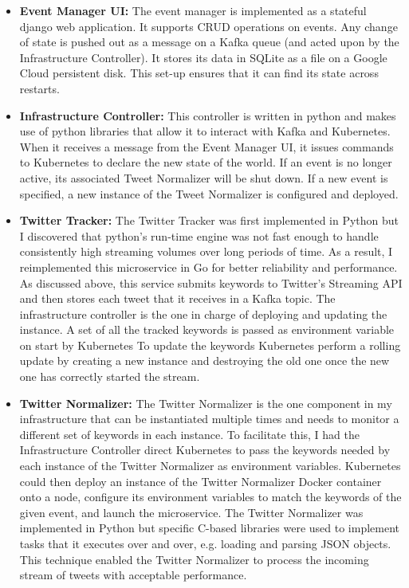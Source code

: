 \begin{itemize}
	\item \textbf{Event Manager UI:} The event manager is implemented as a stateful django web application. It supports CRUD operations on events. Any change of state is pushed out as a message on a Kafka queue (and acted upon by the Infrastructure Controller). It stores its data in SQLite as a file on a Google Cloud persistent disk. This set-up ensures that it can find its state across restarts.
	\item \textbf{Infrastructure Controller:}  This controller is written in python and makes use of python libraries that allow it to interact with Kafka and Kubernetes. When it receives a message from the Event Manager UI, it issues commands to Kubernetes to declare the new state of the world. If an event is no longer active, its associated Tweet Normalizer will be shut down. If a new event is specified, a new instance of the Tweet Normalizer is configured and deployed.
	\item \textbf{Twitter Tracker:} The Twitter Tracker was first implemented in Python but I discovered that python’s run-time engine was not fast enough to handle consistently high streaming volumes over long periods of time. As a result, I reimplemented this microservice in Go for better reliability and performance. As discussed above, this service submits keywords to Twitter’s Streaming API and then stores each tweet that it receives in a Kafka topic. The infrastructure controller is the one in charge of deploying and updating the instance. A set of all the tracked keywords is passed as environment variable on start by Kubernetes To update the keywords Kubernetes perform a rolling update by creating a new instance and destroying the old one once the new one has correctly started the stream. 
	\item \textbf{Twitter Normalizer:} The Twitter Normalizer is the one component in my infrastructure that can be instantiated multiple times and needs to monitor a different set of keywords in each instance. To facilitate this, I had the Infrastructure Controller direct Kubernetes to pass the keywords needed by each instance of the Twitter Normalizer as environment variables. Kubernetes could then deploy an instance of the Twitter Normalizer Docker container onto a node, configure its environment variables to match the keywords of the given event, and launch the microservice. The Twitter Normalizer was implemented in Python but specific C-based libraries were used to implement tasks that it executes over and over, e.g. loading and parsing JSON objects. This technique enabled the Twitter Normalizer to process the incoming stream of tweets with acceptable performance.
\end{itemize}


